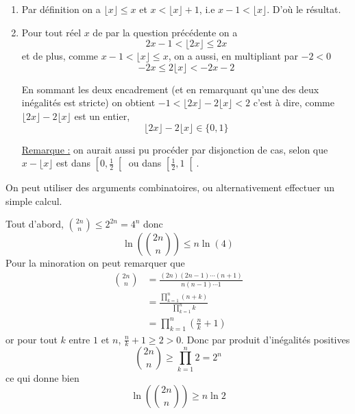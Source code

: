 \begin{sol}
\begin{enumerate}
\item Par définition on a $\lfloor x \rfloor \le x$ et $x <\lfloor x \rfloor + 1$, i.e $x -1 <\lfloor x \rfloor $. D'où le résultat.
\item Pour tout réel $x$ de par la question précédente on a
$$2x-1 < \lfloor 2x  \rfloor \le 2x$$
et de plus, comme $x-1 < \lfloor x  \rfloor \le x$,
on a aussi, en multipliant par $-2 < 0$
$$-2x \le 2 \lfloor x  \rfloor < -2x-2$$

En sommant les deux encadrement (et en remarquant qu'une des deux inégalités est stricte) on obtient
$-1 <\lfloor 2x  \rfloor - 2 \lfloor x  \rfloor< 2$
c'est à dire, comme $\lfloor 2x  \rfloor - 2 \lfloor x  \rfloor$ est un entier,
$$\boxed{\lfloor 2 x \rfloor  - 2 \lfloor x \rfloor \in \{0,1\}}$$

\underline{Remarque :} on aurait aussi pu procéder par disjonction de cas, selon que $x - \lfloor x \rfloor$ est dans $\left[0,\frac{1}{2}\right[$ ou dans $\left[\frac{1}{2},1\right[$.
\end{enumerate}
\end{sol}

\begin{sol}
On peut utiliser des arguments combinatoires, ou alternativement effectuer un simple calcul.

Tout d'abord, $\binom{2n} n \le 2^{2n} = 4^n$ donc 
$$\boxed{\ln \left(\binom{2n} n \right) \le n \ln(4)}$$
Pour la minoration on peut remarquer que
$$\begin{aligned}\binom{2n} n & = \frac{(2n) (2n-1) \cdots (n + 1) }{n (n-1) \cdots 1}\\
& = \frac{\prod_{k = 1}^ n (n + k)}{\prod_{k = 1}^n k} \\
& = \prod_{k = 1}^n \left(\frac n{k} + 1 \right) \end{aligned}$$
or pour tout $k$ entre $1$ et $n$, $\frac n{k} + 1 \ge 2 >0$. Donc par produit d'inégalités positives
$$\binom{2n} n \ge \prod_{k = 1}^n 2 = 2^n$$
ce qui donne bien 
$$\boxed{\ln \left(\binom{2n} n \right) \ge n \ln 2}$$
\end{sol}


